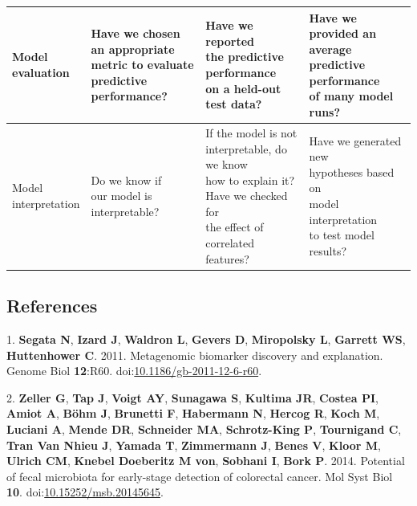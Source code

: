 \documentclass[11pt,]{article}
\begin{document}
\begin{tabular}{|l|l|l|l|}
\makecell[l]{Model \\ evaluation} & \makecell[l]{Have we chosen an appropriate \\ metric to evaluate \\ predictive performance?} & \makecell[l]{Have we reported \\ the predictive performance \\ on a held-out test data?} & \makecell[l]{Have we provided an average \\ predictive performance \\ of many model runs? } \\ \hline

\makecell[l]{Model \\ interpretation} & \makecell[l]{Do we know if \\ our model is \\ interpretable?} & \makecell[l]{If the model is not \\ interpretable, do we know \\how to  explain it? \\ Have we checked for \\ the effect of correlated \\ features?} & \makecell[l]{Have we generated new \\ hypotheses based on \\ model interpretation \\ to test model results? } \\ \hline

\end{tabular}\newpage

\subsection{References}\label{references}

\hypertarget{refs}{}
\hypertarget{ref-segata_metagenomic_2011}{}
1. \textbf{Segata N}, \textbf{Izard J}, \textbf{Waldron L},
\textbf{Gevers D}, \textbf{Miropolsky L}, \textbf{Garrett WS},
\textbf{Huttenhower C}. 2011. Metagenomic biomarker discovery and
explanation. Genome Biol \textbf{12}:R60.
doi:\href{https://doi.org/10.1186/gb-2011-12-6-r60}{10.1186/gb-2011-12-6-r60}.

\hypertarget{ref-zeller_potential_2014}{}
2. \textbf{Zeller G}, \textbf{Tap J}, \textbf{Voigt AY},
\textbf{Sunagawa S}, \textbf{Kultima JR}, \textbf{Costea PI},
\textbf{Amiot A}, \textbf{Böhm J}, \textbf{Brunetti F},
\textbf{Habermann N}, \textbf{Hercog R}, \textbf{Koch M},
\textbf{Luciani A}, \textbf{Mende DR}, \textbf{Schneider MA},
\textbf{Schrotz-King P}, \textbf{Tournigand C}, \textbf{Tran Van Nhieu
J}, \textbf{Yamada T}, \textbf{Zimmermann J}, \textbf{Benes V},
\textbf{Kloor M}, \textbf{Ulrich CM}, \textbf{Knebel Doeberitz M von},
\textbf{Sobhani I}, \textbf{Bork P}. 2014. Potential of fecal microbiota
for early-stage detection of colorectal cancer. Mol Syst Biol
\textbf{10}.
doi:\href{https://doi.org/10.15252/msb.20145645}{10.15252/msb.20145645}.
\end{document}
